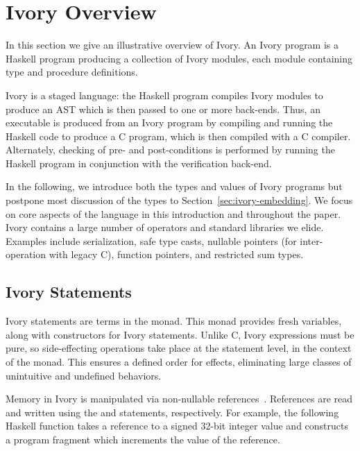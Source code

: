 \section{Ivory Overview}
\label{sec:ivory-overview}


In this section we give an illustrative overview of Ivory.  An Ivory
program is a Haskell program producing a collection of Ivory modules,
each module containing type and procedure definitions.  %

Ivory is a staged language: the Haskell program compiles Ivory modules
to produce an AST which is then passed to one or more back-ends.  Thus,
an executable is produced from an Ivory program by compiling and
running the Haskell code to produce a C program, which is then
compiled with a C compiler.  Alternately, checking of pre- and
post-conditions is performed by running the Haskell program in
conjunction with the verification back-end.

In the following, we introduce both the types and values of Ivory programs but
postpone most discussion of the types to Section~\ref{sec:ivory-embedding}. We
focus on core aspects of the language in this introduction and throughout
the paper. Ivory contains a large number of operators and standard libraries we
elide. Examples include serialization, safe type casts, nullable pointers (for
inter-operation with legacy C), function pointers, and restricted sum types.

\subsection{Ivory Statements}

Ivory statements are terms in the  monad.  This monad
provides fresh variables, along with constructors for Ivory
statements. Unlike C, Ivory expressions must be pure, so
side-effecting operations take place at the statement level, in
the context of the monad. This ensures a defined order for effects,
eliminating large classes of unintuitive and undefined behaviors.

Memory in Ivory is manipulated via non-nullable references~\cite{memareas}.
References are read and written using the  and 
statements, respectively.  For example, the following Haskell function
takes a reference to a signed 32-bit integer value and constructs
a program fragment which increments the value of the reference.

